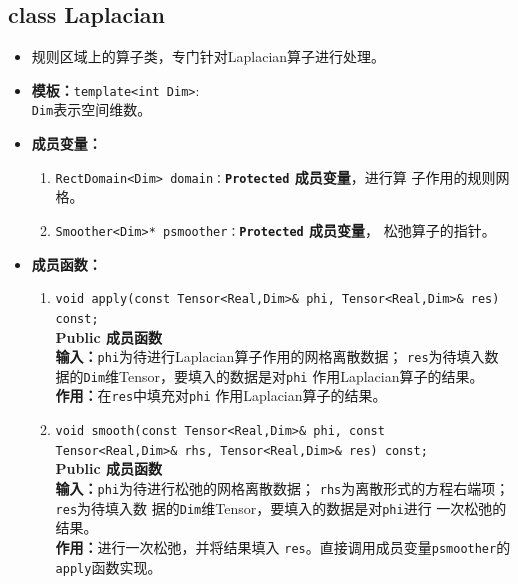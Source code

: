 \documentclass[a4paper,twoside]{ctexart}
\begin{document}
\subsection*{class Laplacian}
\begin{itemize}
    \item 规则区域上的算子类，专门针对Laplacian算子进行处理。
    \item \textbf{模板：}\texttt{template<int Dim>}:\\
    \texttt{Dim}表示空间维数。
    \item \textbf{成员变量：}
        \begin{enumerate}[(1)]
            \item \texttt{RectDomain<Dim>
                domain：}\textbf{\texttt{Protected}  成员变量}，进行算
              子作用的规则网格。
              \item \texttt{Smoother<Dim>*
                  psmoother：}\textbf{\texttt{Protected}  成员变量}，
                松弛算子的指针。
        \end{enumerate}
    \item \textbf{成员函数：}
        \begin{enumerate}[(1)]
            \item \texttt{void apply(const Tensor<Real,Dim>\& phi,
                Tensor<Real,Dim>\& res) const;}\\
              \textbf{Public 成员函数}\\
            \textbf{输入：}\texttt{phi}为待进行Laplacian算子作用的网格离散数据；
            \texttt{res}为待填入数据的\texttt{Dim}维Tensor，要填入的数据是对\texttt{phi}
            作用Laplacian算子的结果。\\
            \textbf{作用：}在\texttt{res}中填充对\texttt{phi}
            作用Laplacian算子的结果。
            \item \texttt{void smooth(const Tensor<Real,Dim>\& phi, const Tensor<Real,Dim>\&
                rhs, Tensor<Real,Dim>\& res) const;}\\
              \textbf{Public 成员函数}\\
            \textbf{输入：}\texttt{phi}为待进行松弛的网格离散数据；
            \texttt{rhs}为离散形式的方程右端项；\texttt{res}为待填入数
            据的\texttt{Dim}维Tensor，要填入的数据是对\texttt{phi}进行
            一次松弛的结果。\\
            \textbf{作用：}进行一次松弛，并将结果填入
            \texttt{res}。直接调用成员变量\texttt{psmoother}的
            \texttt{apply}函数实现。

\end{enumerate}
\end{itemize}
\end{document}
